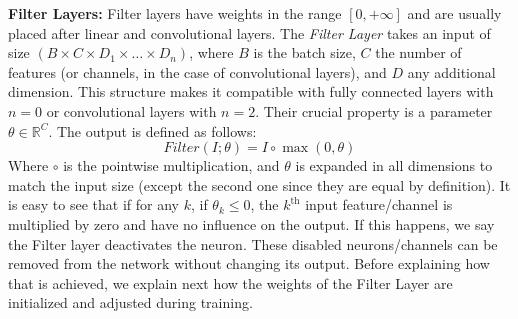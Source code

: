 \documentclass[sigconf]{acmart}
\newcommand{\srm}[1]{\textcolor{red}{{\bf Sam:} #1}}
\newcommand{\gl}[1]{\textcolor{violet}{{\bf Gl:} #1}}
\begin{document}
\textbf{Filter Layers: } Filter layers have weights in the range $[0,+\infty]$ and are usually placed after
linear and convolutional layers.
The \textit{Filter Layer} takes an input of size $\left(B \times C \times D_1
  \times \dots \times D_n\right)$, where $B$ is the batch size, $C$ the number
of features (or channels, in the case of convolutional layers), and $D$ any
additional dimension. This structure makes it compatible with fully connected
layers with $n=0$ or convolutional layers with $n=2$. Their crucial property is
a parameter $\theta \in \mathbb{R}^C$. The output is defined as follows: \vspace{-1em}
\begin{equation} Filter(I;\theta) = I \circ \max(0, \theta) \end{equation}
Where $\circ$ is the pointwise multiplication, and $\theta$ is expanded in all
dimensions to match the input size (except the second one since they are equal
by definition). It is easy to see that if for any $k$, if $\theta_k \leq 0$,
the $k^{\text{th}}$ input feature/channel is multiplied by zero and have no
influence on the output. If this happens, we say the Filter layer deactivates
the neuron. These disabled neurons/channels can be removed from the network
without changing its output. Before explaining how that is achieved, we explain
next how the weights of the Filter Layer are initialized and adjusted during
training.



%
%
%
\end{document}
